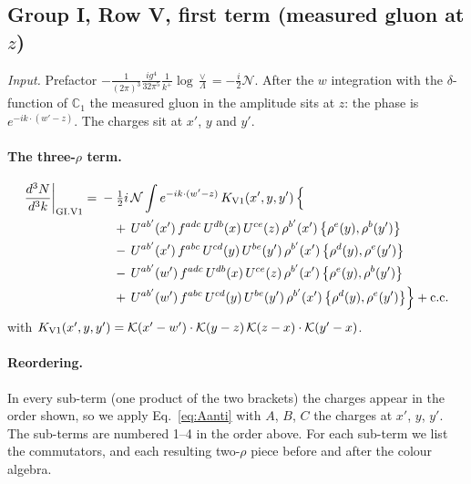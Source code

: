 \documentclass[10pt]{article}
\numberwithin{equation}{section}
\newcommand{\KK}{\mathcal K}
\newcommand{\NN}{\mathcal N}
\begin{document}
\subsection{Group I, Row V, first term (measured gluon at $z$)}\label{sec:GI.V1}
\emph{Input.} Prefactor $-\frac{1}{(2\pi)^3}\frac{ig^4}{32\pi^5}\frac1{k^+}\log\frac\vee\Lambda=-\frac i2\NN$. After the $w$ integration with the $\delta$-function of $\mathbb C_1$ the measured gluon in the amplitude sits at $z$: the phase is $e^{-ik\cdot(w'-z)}$. The charges sit at $x'$, $y$ and $y'$.
\paragraph{The three-$\rho$ term.}
\begin{align}
\frac{d^3N}{d^3k}\bigg|_{\rm GI.V1}={}&-\tfrac12i\,\NN\int e^{-ik\cdot(w'-z)}\,K_{\rm V1}(x',y,y')\,\Big\{\notag\\
&\quad +\,U^{ab'}(x')\,f^{adc}\,U^{db}(x)\,U^{ce}(z)\,\rho^{b'}(x')\,\big\{\rho^{e}(y),\rho^{b}(y')\big\}\notag\\
&\quad -\,U^{ab'}(x')\,f^{abc}\,U^{cd}(y)\,U^{be}(y')\,\rho^{b'}(x')\,\big\{\rho^{d}(y),\rho^{e}(y')\big\}\notag\\
&\quad -\,U^{ab'}(w')\,f^{adc}\,U^{db}(x)\,U^{ce}(z)\,\rho^{b'}(x')\,\big\{\rho^{e}(y),\rho^{b}(y')\big\}\notag\\
&\quad +\,U^{ab'}(w')\,f^{abc}\,U^{cd}(y)\,U^{be}(y')\,\rho^{b'}(x')\,\big\{\rho^{d}(y),\rho^{e}(y')\big\}\Big\}+{\rm c.c.}\label{eq:in-GI.V1}
\end{align}
with $K_{\rm V1}(x',y,y')=\KK(x'-w')\cdot\KK(y-z)\,\KK(z-x)\cdot\KK(y'-x)$.
\paragraph{Reordering.} In every sub-term (one product of the two brackets) the charges appear in the order shown, so we apply Eq.~\eqref{eq:Aanti} with $A$, $B$, $C$ the charges at $x'$, $y$, $y'$. The sub-terms are numbered 1--4 in the order above. For each sub-term we list the commutators, and each resulting two-$\rho$ piece before and after the colour algebra.
\end{document}
